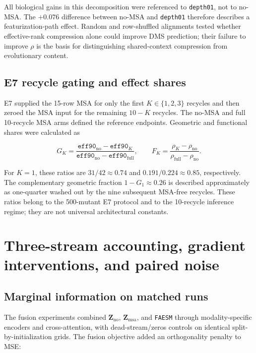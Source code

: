\documentclass[10pt,a4paper]{article}
\newcommand{\Zno}{\mathbf{Z}_{\mathrm{no}}}
\newcommand{\Zmsa}{\mathbf{Z}_{\mathrm{msa}}}
\newcommand{\FAESM}{\texttt{FAESM}}
\begin{document}
All biological gains in this decomposition were referenced to \texttt{depth01}, not to no-MSA. The $+0.076$ difference between no-MSA and \texttt{depth01} therefore describes a featurization-path effect. Random and row-shuffled alignments tested whether effective-rank compression alone could improve DMS prediction; their failure to improve $\rho$ is the basis for distinguishing shared-context compression from evolutionary content.

\subsection{E7 recycle gating and effect shares}

E7 supplied the 15-row MSA for only the first $K\in\{1,2,3\}$ recycles and then zeroed the MSA input for the remaining $10-K$ recycles. The no-MSA and full 10-recycle MSA arms defined the reference endpoints. Geometric and functional shares were calculated as

\begin{equation}
G_K=\frac{\texttt{eff90}_{\mathrm{no}}-\texttt{eff90}_{K}}
{\texttt{eff90}_{\mathrm{no}}-\texttt{eff90}_{\mathrm{full}}},
\qquad
F_K=\frac{\rho_K-\rho_{\mathrm{no}}}{\rho_{\mathrm{full}}-\rho_{\mathrm{no}}}.
\end{equation}

For $K=1$, these ratios are $31/42\approx0.74$ and $0.191/0.224\approx0.85$, respectively. The complementary geometric fraction $1-G_1\approx0.26$ is described approximately as one-quarter washed out by the nine subsequent MSA-free recycles. These ratios belong to the 500-mutant E7 protocol and to the 10-recycle inference regime; they are not universal architectural constants.

\section{Three-stream accounting, gradient interventions, and paired noise}

\subsection{Marginal information on matched runs}

The fusion experiments combined $\Zno$, $\Zmsa$, and \FAESM{} through modality-specific encoders and cross-attention, with dead-stream/zeros controls on identical split-by-initialization grids. The fusion objective added an orthogonality penalty to MSE:
\end{document}
